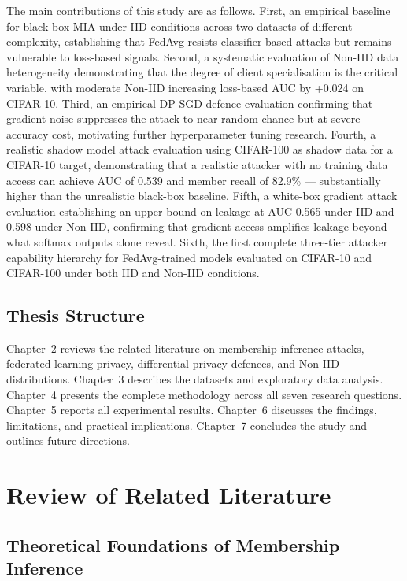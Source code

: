 \documentclass[12pt, a4paper]{report}
\begin{document}
The main contributions of this study are as follows. First, an empirical baseline
for black-box MIA under IID conditions across two datasets of different complexity,
establishing that FedAvg resists classifier-based attacks but remains vulnerable
to loss-based signals. Second, a systematic evaluation of Non-IID data
heterogeneity demonstrating that the degree of client specialisation is the
critical variable, with moderate Non-IID increasing loss-based AUC by +0.024 on
CIFAR-10. Third, an empirical DP-SGD defence evaluation confirming that gradient
noise suppresses the attack to near-random chance but at severe accuracy cost,
motivating further hyperparameter tuning research. Fourth, a realistic shadow
model attack evaluation using CIFAR-100 as shadow data for a CIFAR-10 target,
demonstrating that a realistic attacker with no training data access can achieve
AUC of 0.539 and member recall of 82.9\% --- substantially higher than the
unrealistic black-box baseline. Fifth, a white-box gradient attack evaluation
establishing an upper bound on leakage at AUC 0.565 under IID and 0.598 under
Non-IID, confirming that gradient access amplifies leakage beyond what softmax
outputs alone reveal. Sixth, the first complete three-tier attacker capability
hierarchy for FedAvg-trained models evaluated on CIFAR-10 and CIFAR-100 under
both IID and Non-IID conditions.

\section{Thesis Structure}

Chapter~2 reviews the related literature on membership inference attacks,
federated learning privacy, differential privacy defences, and Non-IID
distributions. Chapter~3 describes the datasets and exploratory data analysis.
Chapter~4 presents the complete methodology across all seven research questions.
Chapter~5 reports all experimental results. Chapter~6 discusses the findings,
limitations, and practical implications. Chapter~7 concludes the study and
outlines future directions.

\chapter{Review of Related Literature}

\section{Theoretical Foundations of Membership Inference}
\end{document}
